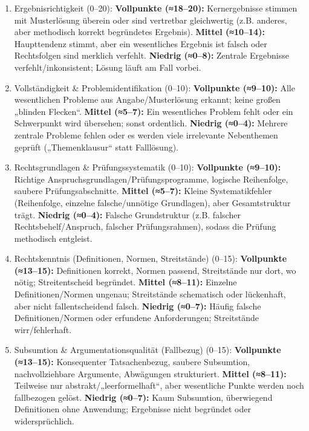 \documentclass[11pt]{article}
\providecommand{\tightlist}{%
  \setlength{\itemsep}{0pt}\setlength{\parskip}{0pt}}
\begin{document}
\begin{enumerate}
\def\labelenumi{\arabic{enumi}.}
\tightlist
\item
  Ergebnisrichtigkeit (0--20): \textbf{Vollpunkte (≈18--20):}
  Kernergebnisse stimmen mit Musterlösung überein oder sind vertretbar
  gleichwertig (z.B. anderes, aber methodisch korrekt begründetes
  Ergebnis). \textbf{Mittel (≈10--14):} Haupttendenz stimmt, aber ein
  wesentliches Ergebnis ist falsch oder Rechtsfolgen sind merklich
  verfehlt. \textbf{Niedrig (≈0--8):} Zentrale Ergebnisse
  verfehlt/inkonsistent; Lösung läuft am Fall vorbei.
\item
  Vollständigkeit \& Problemidentifikation (0--10): \textbf{Vollpunkte
  (≈9--10):} Alle wesentlichen Probleme aus Angabe/Musterlösung erkannt;
  keine großen „blinden Flecken``. \textbf{Mittel (≈5--7):} Ein
  wesentliches Problem fehlt oder ein Schwerpunkt wird übersehen; sonst
  ordentlich. \textbf{Niedrig (≈0--4):} Mehrere zentrale Probleme fehlen
  oder es werden viele irrelevante Nebenthemen geprüft („Themenklausur``
  statt Falllösung).
\item
  Rechtsgrundlagen \& Prüfungssystematik (0--10): \textbf{Vollpunkte
  (≈9--10):} Richtige Anspruchsgrundlagen/Prüfungsprogramme, logische
  Reihenfolge, saubere Prüfungsabschnitte. \textbf{Mittel (≈5--7):}
  Kleine Systematikfehler (Reihenfolge, einzelne falsche/unnötige
  Grundlagen), aber Gesamtstruktur trägt. \textbf{Niedrig (≈0--4):}
  Falsche Grundstruktur (z.B. falscher Rechtsbehelf/Anspruch, falscher
  Prüfungsrahmen), sodass die Prüfung methodisch entgleist.
\item
  Rechtskenntnis (Definitionen, Normen, Streitstände) (0--15):
  \textbf{Vollpunkte (≈13--15):} Definitionen korrekt, Normen passend,
  Streitstände nur dort, wo nötig; Streitentscheid begründet.
  \textbf{Mittel (≈8--11):} Einzelne Definitionen/Normen ungenau;
  Streitstände schematisch oder lückenhaft, aber nicht fallentscheidend
  falsch. \textbf{Niedrig (≈0--7):} Häufig falsche Definitionen/Normen
  oder erfundene Anforderungen; Streitstände wirr/fehlerhaft.
\item
  Subsumtion \& Argumentationsqualität (Fallbezug) (0--15):
  \textbf{Vollpunkte (≈13--15):} Konsequenter Tatsachenbezug, saubere
  Subsumtion, nachvollziehbare Argumente, Abwägungen strukturiert.
  \textbf{Mittel (≈8--11):} Teilweise nur abstrakt/„leerformelhaft``,
  aber wesentliche Punkte werden noch fallbezogen gelöst.
  \textbf{Niedrig (≈0--7):} Kaum Subsumtion, überwiegend Definitionen
  ohne Anwendung; Ergebnisse nicht begründet oder widersprüchlich.

\end{enumerate}
\end{document}
